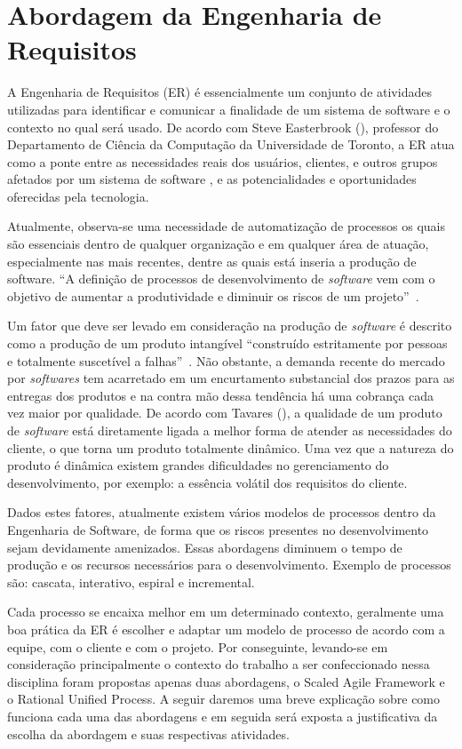 \chapter[Abordagem da Engenharia de Requisitos]{Abordagem da Engenharia de Requisitos}
A Engenharia de Requisitos (ER) é essencialmente um conjunto de atividades utilizadas para identificar e comunicar a finalidade de um sistema de software e o contexto no qual será usado. De acordo com Steve Easterbrook (\citeyear{easterbrook}), professor do Departamento de Ciência da Computação da Universidade de Toronto, a ER atua como a ponte entre as necessidades reais dos usuários, clientes, e outros grupos afetados por um sistema de software , e as potencialidades e oportunidades oferecidas pela tecnologia. 

Atualmente, observa-se uma necessidade de automatização de processos os quais são essenciais dentro de qualquer organização e em qualquer área de atuação, especialmente nas mais recentes, dentre as quais está inseria a produção de software. “A definição de processos de desenvolvimento de \textit{software} vem com o objetivo de aumentar a produtividade e diminuir os riscos de um projeto”~\cite{vieira}.

Um fator que deve ser levado em consideração na produção de \textit{software} é descrito como a produção de um produto intangível “construído estritamente por pessoas e totalmente suscetível a falhas”~\cite{tanenbaum}. Não obstante, a demanda recente do mercado por \textit{softwares} tem acarretado em um encurtamento substancial dos prazos para as entregas dos produtos e na contra mão dessa tendência há uma cobrança cada vez maior por qualidade. De acordo com Tavares (\citeyear{tavares}), a qualidade de um produto de \textit{software} está diretamente ligada a melhor forma de atender as necessidades do cliente, o que torna um produto totalmente dinâmico. Uma vez que a natureza do produto é dinâmica existem grandes dificuldades no gerenciamento do desenvolvimento, por exemplo: a essência volátil dos requisitos do cliente.

Dados estes fatores, atualmente existem vários modelos de processos dentro da Engenharia de Software, de forma que os riscos presentes no desenvolvimento sejam devidamente amenizados. Essas abordagens diminuem o tempo de produção e os recursos necessários para o desenvolvimento. Exemplo de processos são: cascata, interativo, espiral e incremental.

Cada processo se encaixa melhor em um determinado contexto, geralmente uma boa prática da ER é escolher e adaptar um modelo de processo de acordo com a equipe, com o cliente e com o projeto. Por conseguinte, levando-se em consideração principalmente o contexto do trabalho a ser confeccionado nessa disciplina foram propostas apenas duas abordagens, o Scaled Agile Framework e o Rational Unified Process. A seguir daremos uma breve explicação sobre como funciona cada uma das abordagens e em seguida será exposta a justificativa da escolha da abordagem e suas respectivas atividades.

